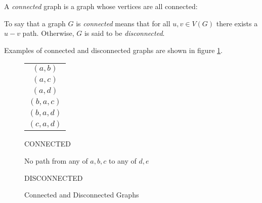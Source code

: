 A \emph{connected} graph is a graph whose vertices are all connected:

\begin{definition}
  To say that a graph \(G\) is \emph{connected} means that for all \(u,v\in V(G)\) there exists a \(u-v\) path.
  Otherwise, \(G\) is said to be \emph{disconnected}.
\end{definition}

Examples of connected and disconnected graphs are shown in figure \ref{fig:connect}.

\begin{figure}[h]
  \label{fig:connect}
  \begin{minipage}[t]{2.5in}
    \begin{center}

      \bigskip

      \begin{tabular}{c}
        \((a,b)\) \\
        \((a,c)\) \\
        \((a,d)\) \\
        \((b,a,c)\) \\
        \((b,a,d)\) \\
        \((c,a,d)\)
      \end{tabular}

      \bigskip
      
      CONNECTED
    \end{center}
  \end{minipage}
  \begin{minipage}[t]{3in}
    \begin{center}

      \bigskip
      
      No path from any of \(a,b,c\) to any of \(d,e\)

      \bigskip

      DISCONNECTED
    \end{center}
  \end{minipage}
  \caption{Connected and Disconnected Graphs}
\end{figure}

